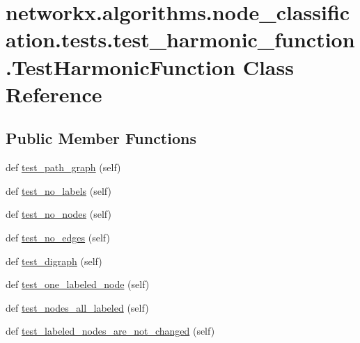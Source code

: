 \hypertarget{classnetworkx_1_1algorithms_1_1node__classification_1_1tests_1_1test__harmonic__function_1_1TestHarmonicFunction}{}\section{networkx.\+algorithms.\+node\+\_\+classification.\+tests.\+test\+\_\+harmonic\+\_\+function.\+Test\+Harmonic\+Function Class Reference}
\label{classnetworkx_1_1algorithms_1_1node__classification_1_1tests_1_1test__harmonic__function_1_1TestHarmonicFunction}
\subsection*{Public Member Functions}
\begin{DoxyCompactItemize}
\item 
def \hyperlink{classnetworkx_1_1algorithms_1_1node__classification_1_1tests_1_1test__harmonic__function_1_1TestHarmonicFunction_a4c694aa726f8845369ff0415457a84a4}{test\+\_\+path\+\_\+graph} (self)
\item 
def \hyperlink{classnetworkx_1_1algorithms_1_1node__classification_1_1tests_1_1test__harmonic__function_1_1TestHarmonicFunction_ad1615ef21243e42b22531280a3316e70}{test\+\_\+no\+\_\+labels} (self)
\item 
def \hyperlink{classnetworkx_1_1algorithms_1_1node__classification_1_1tests_1_1test__harmonic__function_1_1TestHarmonicFunction_a3b3b78f0170707f9102b68d4fbe9223a}{test\+\_\+no\+\_\+nodes} (self)
\item 
def \hyperlink{classnetworkx_1_1algorithms_1_1node__classification_1_1tests_1_1test__harmonic__function_1_1TestHarmonicFunction_afb89b7295b086624bc2516cf73ffebdf}{test\+\_\+no\+\_\+edges} (self)
\item 
def \hyperlink{classnetworkx_1_1algorithms_1_1node__classification_1_1tests_1_1test__harmonic__function_1_1TestHarmonicFunction_aaf533e60141875587bb4739d53c8ece0}{test\+\_\+digraph} (self)
\item 
def \hyperlink{classnetworkx_1_1algorithms_1_1node__classification_1_1tests_1_1test__harmonic__function_1_1TestHarmonicFunction_a9343784d110957349e476e7886837cbb}{test\+\_\+one\+\_\+labeled\+\_\+node} (self)
\item 
def \hyperlink{classnetworkx_1_1algorithms_1_1node__classification_1_1tests_1_1test__harmonic__function_1_1TestHarmonicFunction_a68983e63c50c2f2d8b169800c5fa4d30}{test\+\_\+nodes\+\_\+all\+\_\+labeled} (self)
\item 
def \hyperlink{classnetworkx_1_1algorithms_1_1node__classification_1_1tests_1_1test__harmonic__function_1_1TestHarmonicFunction_ac375510c9e6268361512bb2cec2267f4}{test\+\_\+labeled\+\_\+nodes\+\_\+are\+\_\+not\+\_\+changed} (self)
\end{DoxyCompactItemize}


